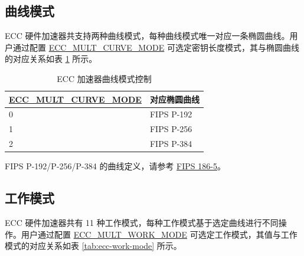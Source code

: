 \documentclass[main\_\_CN.tex]{subfiles}
\begin{document}
\subsection{曲线模式}

\chipname{} ECC 硬件加速器共支持两种曲线模式，每种曲线模式唯一对应一条椭圆曲线。用户通过配置 \hyperref[fielddesc:ECCMULTCURVEMODE]{ECC\_MULT\_CURVE\_MODE} 可选定密钥长度模式，其与椭圆曲线的对应关系如表 \ref{tab:ecc-curve-mode} 所示。


\begin{table}[H]
    \centering
    \caption{ECC 加速器曲线模式控制}
    \label{tab:ecc-curve-mode}
    \begin{threeparttable}
    \begin{tabular}{|p{4.2cm}|p{3.6cm}|}
    \hline
        \rowcolor{lightgray}
        \textbf{\hyperref[fielddesc:ECCMULTCURVEMODE]{ECC\_MULT\_CURVE\_MODE}} & \textbf{对应椭圆曲线\tnote{*}} \\ \hline
        0 & FIPS P-192  \\\hline
        1 & FIPS P-256  \\\hline
        2 & FIPS P-384  \\\hline
    \end{tabular}
    \begin{tablenotes}
        \item[*] FIPS P-192/P-256/P-384 的曲线定义，请参考 \href{https://nvlpubs.nist.gov/nistpubs/FIPS/NIST.FIPS.186-5.pdf}{FIPS 186-5}。
    \end{tablenotes}
    \end{threeparttable}
\end{table}

\subsection{工作模式}
\label{sec:ecc-work-mode}

\chipname{} ECC 硬件加速器共有 11 种工作模式，每种工作模式基于选定曲线进行不同操作。用户通过配置 \hyperref[fielddesc:ECCMULTWORKMODE]{ECC\_MULT\_WORK\_MODE} 可选定工作模式，其值与工作模式的对应关系如表 \ref{tab:ecc-work-mode} 所示。
\end{document}
